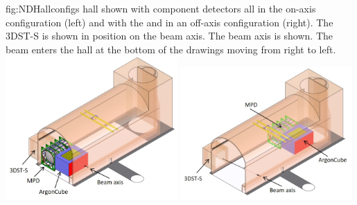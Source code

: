 \begin{dunefigure}{fig:NDHallconfigs}
{  hall shown with component detectors all in the on-axis configuration (left) and with the  and  in an off-axis configuration (right). The 3DST-S is shown in position on the beam axis. The beam axis is shown.  The beam enters the hall at the bottom of the drawings moving from right to left.}
\includegraphics[width=0.49\textwidth]{graphics/NDHall_onaxis.jpg}
\includegraphics[width=0.49\textwidth]{graphics/NDHall_offaxis.jpg}
\end{dunefigure}



